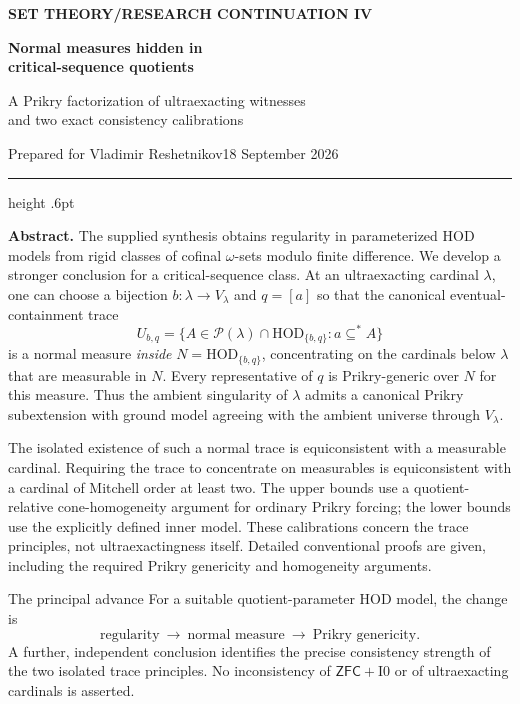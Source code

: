 \documentclass[11pt,letterpaper]{article}
\theoremstyle{definition}
\numberwithin{equation}{section}
\newcommand{\ZFC}{\mathsf{ZFC}}
\newcommand{\HOD}{\mathrm{HOD}}
\newcommand{\Pow}{\mathcal P}
\newcommand{\Izero}{\mathrm{I0}}
\begin{document}
\thispagestyle{empty}
{\sffamily\bfseries\small\color{Olive}SET THEORY\quad /\quad RESEARCH CONTINUATION IV}

\vspace{13pt}
{\fontsize{28}{31}\selectfont\bfseries\color{Forest}Normal measures hidden in\\ critical-sequence quotients\par}
\vspace{10pt}
{\fontsize{14}{18}\selectfont A Prikry factorization of ultraexacting witnesses\\ and two exact consistency calibrations\par}
\vspace{14pt}
{\color{Muted}Prepared for Vladimir Reshetnikov\hfill 18 September 2026\par}
\vspace{3pt}
{\color{Sage}\hrule height .6pt}
\vspace{12pt}

\textbf{Abstract.}
The supplied synthesis obtains regularity in parameterized HOD models from
rigid classes of cofinal $\omega$-sets modulo finite difference. We develop a
stronger conclusion for a critical-sequence class. At an ultraexacting
cardinal $\lambda$, one can choose a bijection $b:\lambda\to V_\lambda$ and
$q=[a]$ so that the canonical eventual-containment trace
\[
 U_{b,q}=\{A\in\Pow(\lambda)\cap\HOD_{\{b,q\}}:
                   a\subseteq^* A\}
\]
is a normal measure \emph{inside} $N=\HOD_{\{b,q\}}$, concentrating on the
cardinals below $\lambda$ that are measurable in $N$. Every representative
of $q$ is Prikry-generic over $N$ for this measure. Thus the ambient
singularity of $\lambda$ admits a canonical Prikry subextension with ground
model agreeing with the ambient universe through $V_\lambda$.

The isolated existence of such a normal trace is equiconsistent with a
measurable cardinal. Requiring the trace to concentrate on measurables is
equiconsistent with a cardinal of Mitchell order at least two. The upper
bounds use a quotient-relative cone-homogeneity argument for ordinary
Prikry forcing; the lower bounds use the explicitly defined inner model.
These calibrations concern the trace principles, not ultraexactingness
itself. Detailed conventional proofs are given, including the required
Prikry genericity and homogeneity arguments.

\begin{assessment}{The principal advance}
For a suitable quotient-parameter HOD model, the change is
\[
 \text{regularity}\ \longrightarrow\ \text{normal measure}
 \ \longrightarrow\ \text{Prikry genericity}.
\]
A further, independent conclusion identifies the precise consistency
strength of the two isolated trace principles. No inconsistency of
$\ZFC+\Izero$ or of ultraexacting cardinals is asserted.
\end{assessment}
\end{document}
